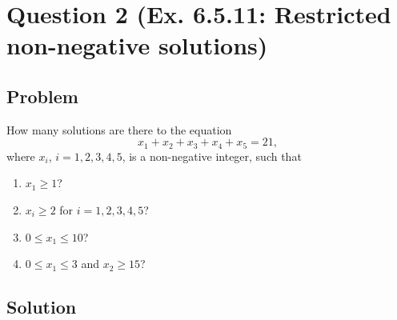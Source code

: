 \documentclass[12pt]{article}
\begin{document}
\newpage

\section{Question 2 (Ex. 6.5.11: Restricted non-negative solutions)}
\subsection{Problem}
How many solutions are there to the equation
\[
x_1+x_2+x_3+x_4+x_5=21,
\]
where $x_i$, $i=1,2,3,4,5$, is a non-negative integer, such that
\begin{enumerate}[label=(\alph*)]
\item $x_1\ge 1$?
\item $x_i\ge 2$ for $i=1,2,3,4,5$?
\item $0\le x_1\le 10$?
\item $0\le x_1\le 3$ and $x_2\ge 15$?
\end{enumerate}

\subsection{Solution}
\end{document}
